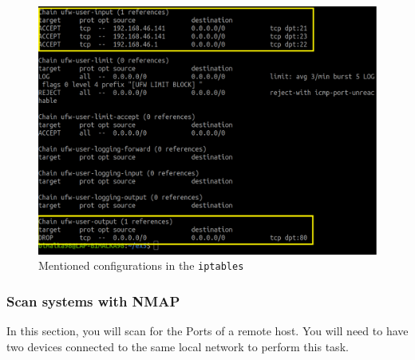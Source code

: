 \documentclass[11pt,letterpaper]{article}
\newenvironment{answer}{\em \color{blue} \begin{adjustwidth}{1cm}{1cm}}{\end{adjustwidth}}
\begin{document}
\begin{enumerate}
\begin{answer}
			\begin{figure}[H]
				\centering
				\includegraphics[width=0.75\columnwidth]{images/part2/6.png}
				\caption{Mentioned configurations in the {\tt iptables}}
			\end{figure}
		\end{answer}
		\pagebreak
		\subsubsection*{Scan systems with NMAP}
		In this section, you will scan for the Ports of a remote host. You will need to have two devices connected to the same local network to perform this task. 
		

\end{enumerate}
\end{document}
